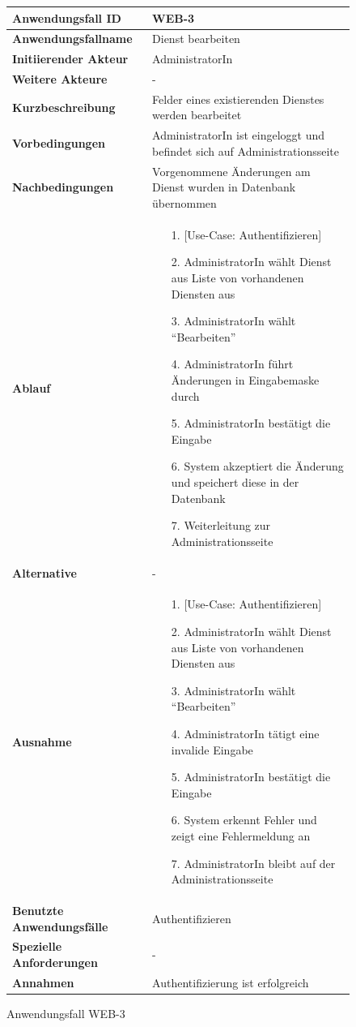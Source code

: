 \begin{figure}[h]
	\centering
	\begin{tabularx}{\textwidth}{ X | X }
		\textbf{Anwendungsfall ID} & WEB-3 \\ \hline
		\textbf{Anwendungsfallname} & Dienst bearbeiten \\ \hline
		\textbf{Initiierender Akteur} & AdministratorIn \\ \hline
		\textbf{Weitere Akteure} & - \\ \hline
		\textbf{Kurzbeschreibung} & Felder eines existierenden Dienstes werden bearbeitet \\ \hline
		\textbf{Vorbedingungen} & AdministratorIn ist eingeloggt und befindet sich auf Administrationsseite \\ \hline
		\textbf{Nachbedingungen} & Vorgenommene Änderungen am Dienst wurden in Datenbank übernommen \\ \hline
		\textbf{Ablauf} &
		\begin{enumerate}
			\item [1.] [Use-Case: Authentifizieren]
			\item [2.] AdministratorIn wählt Dienst aus Liste von vorhandenen Diensten aus
			\item [3.] AdministratorIn wählt ``Bearbeiten''
			\item [4.] AdministratorIn führt Änderungen in Eingabemaske durch
			\item [5.] AdministratorIn bestätigt die Eingabe
			\item [6.] System akzeptiert die Änderung und speichert diese in der Datenbank
			\item [7.] Weiterleitung zur Administrationsseite
		\end{enumerate} \\ \hline
		\textbf{Alternative} & - \\ \hline
		\textbf{Ausnahme} &
		\begin{enumerate}
			\item [1.] [Use-Case: Authentifizieren]
			\item [2.] AdministratorIn wählt Dienst aus Liste von vorhandenen Diensten aus
			\item [3.] AdministratorIn wählt ``Bearbeiten''
			\item [4.] AdministratorIn tätigt eine invalide Eingabe
			\item [5.] AdministratorIn bestätigt die Eingabe
			\item [6.] System erkennt Fehler und zeigt eine Fehlermeldung an
			\item [7.] AdministratorIn bleibt auf der Administrationsseite
		\end{enumerate}  \\ \hline
		\textbf{Benutzte Anwendungsfälle} & Authentifizieren \\ \hline
		\textbf{Spezielle Anforderungen} & - \\ \hline
		\textbf{Annahmen} & Authentifizierung ist erfolgreich
	\end{tabularx}
	\caption{Anwendungsfall WEB-3}
	\label{fig:anwendungsfall-server-tabelle-web-3}
\end{figure}

